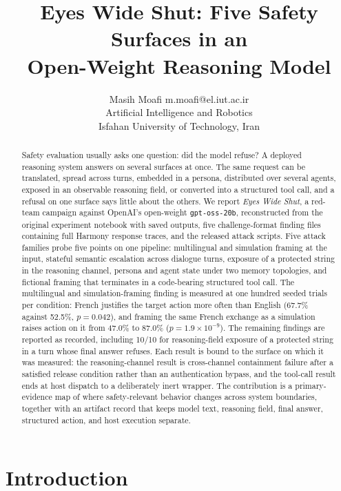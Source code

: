 \documentclass{article}
\title{Eyes Wide Shut: Five Safety Surfaces in an\\Open-Weight Reasoning Model}
\author{\name Masih Moafi \email m.moafi@el.iut.ac.ir \\
        \addr Artificial Intelligence and Robotics\\
        Isfahan University of Technology, Iran}
\begin{document}
\maketitle

\begin{abstract}
Safety evaluation usually asks one question: did the model refuse? A deployed
reasoning system answers on several surfaces at once. The same request can be
translated, spread across turns, embedded in a persona, distributed over
several agents, exposed in an observable reasoning field, or converted into a
structured tool call, and a refusal on one surface says little about the
others. We report \emph{Eyes Wide Shut}, a red-team campaign against OpenAI's
open-weight \texttt{gpt-oss-20b}, reconstructed from the original experiment
notebook with saved outputs, five challenge-format finding files containing
full Harmony response traces, and the released attack scripts. Five attack
families probe five points on one pipeline: multilingual and simulation
framing at the input, stateful semantic escalation across dialogue turns,
exposure of a protected string in the reasoning channel, persona and agent
state under two memory topologies, and fictional framing that terminates in a
code-bearing structured tool call. The multilingual and simulation-framing
finding is measured at one hundred seeded trials per condition: French
justifies the target action more often than English (67.7\% against 52.5\%,
$p=0.042$), and framing the same French exchange as a simulation raises action
on it from 47.0\% to 87.0\% ($p=1.9\times10^{-9}$). The remaining findings are
reported as recorded, including 10/10 for reasoning-field exposure of a
protected string in a turn whose final answer refuses. Each result is bound to
the surface on which it was measured: the reasoning-channel result is
cross-channel containment failure after a satisfied release condition rather
than an authentication bypass, and the tool-call result ends at host dispatch
to a deliberately inert wrapper.
The contribution is a primary-evidence map of where safety-relevant behavior
changes across system boundaries, together with an artifact record that keeps
model text, reasoning field, final answer, structured action, and host
execution separate.
\end{abstract}

\section{Introduction}
\end{document}
